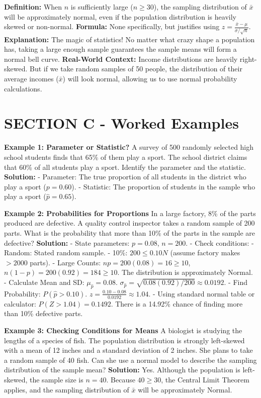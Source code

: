 \begin{lessonbox}
\textbf{Definition:} When $n$ is sufficiently large ($n \geq 30$), the sampling distribution of $\bar{x}$ will be approximately normal, even if the population distribution is heavily skewed or non-normal.
\textbf{Formula:} None specifically, but justifies using $z = \frac{\bar{x} - \mu}{\sigma/\sqrt{n}}$.
\textbf{Explanation:} The magic of statistics! No matter what crazy shape a population has, taking a large enough sample guarantees the sample means will form a normal bell curve.
\textbf{Real-World Context:} Income distributions are heavily right-skewed. But if we take random samples of 50 people, the distribution of their average incomes ($\bar{x}$) will look normal, allowing us to use normal probability calculations.
\end{lessonbox}

\section{SECTION C - Worked Examples}

\textbf{Example 1: Parameter or Statistic?}
A survey of 500 randomly selected high school students finds that 65\% of them play a sport. The school district claims that 60\% of all students play a sport. Identify the parameter and the statistic.
\textbf{Solution:} 
- Parameter: The true proportion of all students in the district who play a sport ($p = 0.60$).
- Statistic: The proportion of students in the sample who play a sport ($\hat{p} = 0.65$).

\textbf{Example 2: Probabilities for Proportions}
In a large factory, 8\% of the parts produced are defective. A quality control inspector takes a random sample of 200 parts. What is the probability that more than 10\% of the parts in the sample are defective?
\textbf{Solution:}
- State parameters: $p = 0.08$, $n = 200$.
- Check conditions: 
  - Random: Stated random sample.
  - 10\%: $200 \leq 0.10N$ (assume factory makes $>2000$ parts).
  - Large Counts: $np = 200(0.08) = 16 \geq 10$, $n(1-p) = 200(0.92) = 184 \geq 10$. The distribution is approximately Normal.
- Calculate Mean and SD: $\mu_{\hat{p}} = 0.08$. $\sigma_{\hat{p}} = \sqrt{0.08(0.92)/200} \approx 0.0192$.
- Find Probability: $P(\hat{p} > 0.10)$. $z = \frac{0.10 - 0.08}{0.0192} \approx 1.04$.
- Using standard normal table or calculator: $P(Z > 1.04) = 0.1492$.
There is a 14.92\% chance of finding more than 10\% defective parts.

\textbf{Example 3: Checking Conditions for Means}
A biologist is studying the lengths of a species of fish. The population distribution is strongly left-skewed with a mean of 12 inches and a standard deviation of 2 inches. She plans to take a random sample of 40 fish. Can she use a normal model to describe the sampling distribution of the sample mean?
\textbf{Solution:}
Yes. Although the population is left-skewed, the sample size is $n=40$. Because $40 \geq 30$, the Central Limit Theorem applies, and the sampling distribution of $\bar{x}$ will be approximately Normal.

